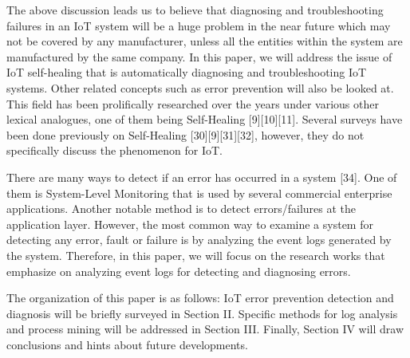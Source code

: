 The above discussion leads us to believe that diagnosing and troubleshooting failures in an IoT system will be a huge problem in the near future which may not be covered by any manufacturer, unless all the entities within the system are manufactured by the same company. In this paper, we will address the issue of IoT self-healing that is automatically diagnosing and troubleshooting IoT systems. Other related concepts such as error prevention will also be looked at. This field has been prolifically researched over the years under various other lexical analogues, one of them being Self-Healing [9][10][11]. Several surveys have been done previously on Self-Healing [30][9][31][32], however, they do not specifically discuss the phenomenon for IoT.

There are many ways to detect if an error has occurred in a system [34]. One of them is System-Level Monitoring that is used by several commercial enterprise applications. Another notable method is to detect errors/failures at the application layer. However, the most common way to examine a system for detecting any error, fault or failure is by analyzing the event logs generated by the system. Therefore, in this paper, we will focus on the research works that emphasize on analyzing event logs for detecting and diagnosing errors.

The organization of this paper is as follows: IoT error prevention detection and diagnosis will be briefly surveyed in Section II. Specific methods for log analysis and process mining will be addressed in Section III. Finally, Section IV will draw conclusions and hints about future developments.
